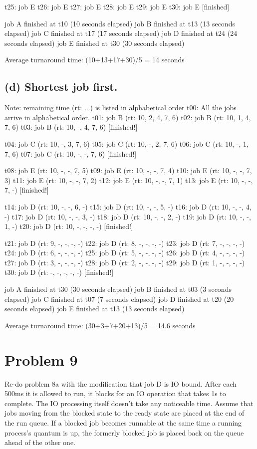 \documentclass[11pt]{article}
\begin{document}
t25: job E 
t26: job E
t27: job E
t28: job E
t29: job E
t30: job E [finished]

job A finished at t10 (10 seconds elapsed)
job B finished at t13 (13 seconds elapsed)
job C finished at t17 (17 seconds elapsed)
job D finished at t24 (24 seconds elapsed)
job E finished at t30 (30 seconds elapsed)

Average turnaround time: (10+13+17+30)/5 = 14 seconds


\subsection*{(d) Shortest job first.}
Note: remaining time (rt: ...) is listed in alphabetical order
t00: All the jobs arrive in alphabetical order. 
t01: job B (rt: 10, 2, 4, 7, 6)
t02: job B (rt: 10, 1, 4, 7, 6)
t03: job B (rt: 10, -, 4, 7, 6) [finished!]

t04: job C (rt: 10, -, 3, 7, 6)
t05: job C (rt: 10, -, 2, 7, 6)
t06: job C (rt: 10, -, 1, 7, 6)
t07: job C (rt: 10, -, -, 7, 6) [finished!]

t08: job E (rt: 10, -, -, 7, 5)
t09: job E (rt: 10, -, -, 7, 4)
t10: job E (rt: 10, -, -, 7, 3)
t11: job E (rt: 10, -, -, 7, 2)
t12: job E (rt: 10, -, -, 7, 1)
t13: job E (rt: 10, -, -, 7, -) [finished!]

t14: job D (rt: 10, -, -, 6, -)
t15: job D (rt: 10, -, -, 5, -)
t16: job D (rt: 10, -, -, 4, -)
t17: job D (rt: 10, -, -, 3, -)
t18: job D (rt: 10, -, -, 2, -)
t19: job D (rt: 10, -, -, 1, -)
t20: job D (rt: 10, -, -, -, -) [finished!]

t21: job D (rt: 9, -, -, -, -)
t22: job D (rt: 8, -, -, -, -)
t23: job D (rt: 7, -, -, -, -)
t24: job D (rt: 6, -, -, -, -)
t25: job D (rt: 5, -, -, -, -)
t26: job D (rt: 4, -, -, -, -)
t27: job D (rt: 3, -, -, -, -)
t28: job D (rt: 2, -, -, -, -)
t29: job D (rt: 1, -, -, -, -)
t30: job D (rt: -, -, -, -, -) [finished!]

job A finished at t30 (30 seconds elapsed)
job B finished at t03 (3 seconds elapsed)
job C finished at t07 (7 seconds elapsed)
job D finished at t20 (20 seconds elapsed)
job E finished at t13 (13 seconds elapsed)

Average turnaround time: (30+3+7+20+13)/5 = 14.6 seconds


\section*{Problem 9}
Re-do problem 8a with the modification that job D is IO bound. After each 500ms it is allowed to run, it blocks for an IO operation that takes 1s to complete. The IO processing itself doesn’t take any noticeable time. Assume that jobs moving from the blocked state to the ready state are placed at the end of the run queue. If a blocked job becomes runnable at the same time a running process’s quantum is up, the formerly blocked job is placed back on the queue ahead of the other one.
\end{document}
